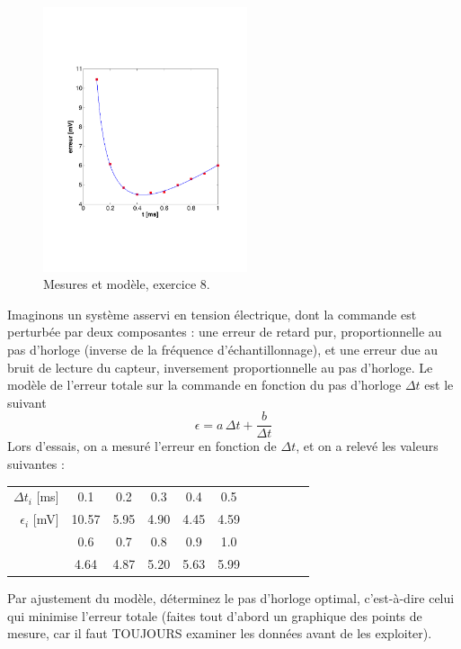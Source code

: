 \begin{figure}
	\centering
	\vspace{-5mm}
	\includegraphics[width=6cm]{assets/figures/exe9fig1serie2.pdf}
	\caption{Mesures et modèle, exercice 8.}
	\label{fig:exe9}
\end{figure}
Imaginons un système asservi en tension électrique, dont la commande est perturbée par deux composantes : une erreur de retard pur, proportionnelle au pas d'horloge (inverse de la fréquence d'échantillonnage), et une erreur due au bruit de lecture du capteur, inversement proportionnelle au pas d'horloge. Le modèle de l'erreur totale sur la commande en fonction du pas d'horloge $\Delta t$ est le suivant
$$
\epsilon=a\,\Delta t+\frac{b}{\Delta t}
$$
Lors d'essais, on a mesuré l'erreur en fonction de $\Delta t$, et on a relevé les valeurs suivantes :
\begin{center}
\hspace{6cm}\begin{tabular}{r|cccccccccc}
$\Delta t_i$ [ms] & 0.1 & 0.2 & 0.3 & 0.4 & 0.5 \\
$\epsilon_i$ [mV] & 10.57 & 5.95 & 4.90 & 4.45 & 4.59 \\
                  & 0.6 & 0.7 & 0.8 & 0.9 & 1.0\\
                  & 4.64 & 4.87 & 5.20 & 5.63 & 5.99
\end{tabular}
\end{center}

Par ajustement du modèle, déterminez le pas d'horloge optimal, c'est-à-dire celui qui minimise l'erreur totale (faites tout d'abord un graphique des points de mesure, car il faut TOUJOURS examiner les données avant de les exploiter).
